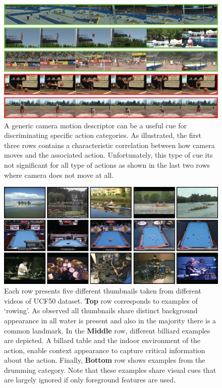 \begin{figure}[t!]
\begin{center}
\includegraphics[width=0.98\linewidth]{fig/camMotion.png}
\end{center}
\caption{A generic camera motion descriptor can be a useful cue for discriminating specific action categories. As illustrated, the first three rows contains a characteristic correlation between how camera moves and the associated action. Unfortunately, this type of cue its not significant for all type of actions as shown in the last two rows where camera does not move at all.}
\label{fig:camMotion_example}
\end{figure}

\begin{figure}[t!]
\begin{center}
\includegraphics[width=0.98\linewidth]{fig/sift.png}
\end{center}
\caption{Each row presents five different thumbnails taken from different videos of UCF50 dataset. \textbf{Top} row corresponds to examples of `rowing'. As observed all thumbnails share distinct background appearance \ie in all water is present and also in the majority there is a common landmark. In the \textbf{Middle} row, different billiard examples are depicted. A billard table and the indoor environment of the action, enable context appearance to capture critical information about the action. Finally, \textbf{Bottom} row shows examples from the drumming category. Note that these examples share visual cues that are largely ignored if only foreground features are used.}
\label{fig:sift_example}
\end{figure}



